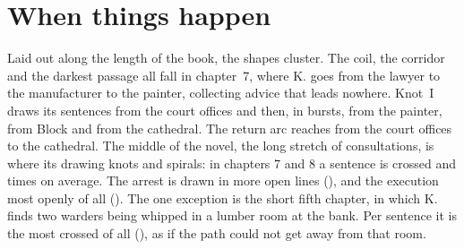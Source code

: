 \section{When things happen}

\begin{center}
\end{center}

\noindent Laid out along the length of the book, the shapes cluster. The coil,
the corridor and the darkest passage all fall in chapter~7, where K. goes from
the lawyer to the manufacturer to the painter, collecting advice that leads
nowhere. Knot~I draws its sentences from the court offices and then, in
bursts, from the painter, from Block and from the cathedral. The return arc
reaches from the court offices to the cathedral. The middle of the novel, the
long stretch of consultations, is where its drawing knots and spirals: in
chapters 7 and 8 a sentence is crossed  and  times on
average. The arrest is drawn in more open lines (), and the
execution most openly of all (). The one exception is the short
fifth chapter, in which K. finds two warders being whipped in a lumber room at
the bank. Per sentence it is the most crossed of all (), as if the
path could not get away from that room.

